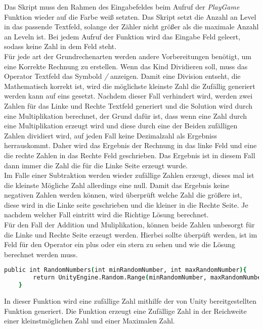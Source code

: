 Das Skript muss den Rahmen des Eingabefeldes beim Aufruf der \textit{PlayGame} Funktion wieder auf die Farbe weiß setzten. Das Skript setzt die Anzahl an Level in das passende Textfeld, solange der Zähler nicht größer als die maximale Anzahl an Leveln ist. Bei jedem Aufruf der Funktion wird das Eingabe Feld geleert, sodass keine Zahl in dem Feld steht.\\
Für jede art der Grundrechenarten werden andere Vorbereitungen benötigt, um eine Korrekte Rechnung zu erstellen. Wenn das Kind Dividieren soll, muss das Operator Textfeld das Symbold \textit{/} anzeigen. Damit eine Division entseht, die Mathematisch korrekt ist, wird die möglichste kleinste Zahl die Zufällig generiert werden kann auf eins gesetzt. Nachdem dieser Fall verhindert wird, werden zwei Zahlen für das Linke und Rechte Textfeld generiert und die Solution wird durch eine Multiplikation berechnet, der Grund dafür ist, dass wenn eine Zahl durch eine Multiplikation erzeugt wird und diese durch eine der Beiden zufälligen Zahlen dividiert wird, auf jeden Fall keine Dezimalzahl als Ergebniss herrauskommt. Daher wird das Ergebnis der Rechnung in das linke Feld und eine die rechte Zahlen in das Rechte Feld geschrieben. Das Ergebnis ist in diesem Fall dann immer die Zahl die für die Linke Seite erzeugt wurde.\\
Im Falle einer Subtraktion werden wieder zufällige Zahlen erzeugt, dieses mal ist die kleinste Mögliche Zahl allerdings eine null. Damit das Ergebnis keine negativen Zahlen werden können, wird überprüft welche Zahl die größere ist, diese wird in die Linke seite geschrieben und die kleiner in die Rechte Seite. Je nachdem welcher Fall eintritt wird die Richtige Lösung berechnet.\\
Für den Fall der Addition und Muliplikation, können beide Zahlen unbesorgt für die Linke und Rechte Seite erzeugt werden. Hierbei sollte überpüft werden, ist im Feld für den Operator ein plus oder ein stern zu sehen  und wie die Lösung berechnet werden muss.\\
\begin{lstlisting}[language=csh, caption={MathOperations.cs RandomNumber Funktion}]
	public int RandomNumbers(int minRandomNumber, int maxRandomNumber){
		return UnityEngine.Random.Range(minRandomNumber, maxRandomNumber);
	}
\end{lstlisting}
In dieser Funktion wird eine zufällige Zahl mithilfe der von Unity bereitgestellten Funktion generiert. Die Funktion erzeugt eine Zufällige Zahl in der Reichweite einer kleinstmöglichen Zahl und einer Maximalen Zahl.\\
